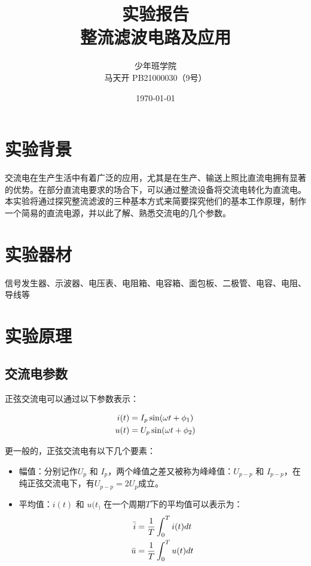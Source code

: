 \documentclass[a4paper]{ltxdoc}
\title{实验报告\\整流滤波电路及应用}
\author{少年班学院\\马天开 PB21000030（9号）}
\date{\today}
\begin{document}
\begin{multicols}{2}
    \maketitle
    \section{实验背景}

    交流电在生产生活中有着广泛的应用，尤其是在生产、输送上照比直流电拥有显著的优势。在部分直流电要求的场合下，可以通过整流设备将交流电转化为直流电。本实验将通过探究整流滤波的三种基本方式来简要探究他们的基本工作原理，制作一个简易的直流电源，并以此了解、熟悉交流电的几个参数。

    \section{实验器材}

    信号发生器、示波器、电压表、电阻箱、电容箱、面包板、二极管、电容、电阻、导线等

    \section{实验原理}

    \subsection{交流电参数}
    正弦交流电可以通过以下参数表示：

    \begin{equation}
        \begin{aligned}
            i(t) & = I_p \sin(\omega t + \phi_1) \\
            u(t) & = U_p \sin(\omega t + \phi_2)
        \end{aligned}
        \notag
    \end{equation}

    更一般的，正弦交流电有以下几个要素：

    \begin{itemize}
        \item 幅值：分别记作$U_p$ 和 $I_p$，两个峰值之差又被称为峰峰值：$U_{p-p}$ 和 $I_{p-p}$，在纯正弦交流电下，有$U_{p-p} = 2U_p$成立。
        \item 平均值：$i(t)$ 和 $u(t_)$ 在一个周期$T$下的平均值可以表示为：
              \begin{equation}
                  \begin{aligned}
                      \bar i & = \dfrac 1 T \int^{T} _{0} i(t) dt \\
                      \bar u & = \dfrac 1 T \int^{T} _{0} u(t) dt \\
                  \end{aligned}
                  \notag
              \end{equation}


\end{itemize}
\end{multicols}
\end{document}
